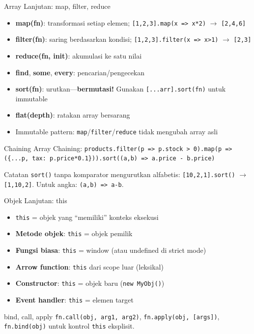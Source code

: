 \documentclass[handout]{beamer}
\begin{document}
\begin{frame}{Array Lanjutan: map, filter, reduce}
	\begin{itemize}
		\item \textbf{map(fn)}: transformasi setiap elemen; \texttt{[1,2,3].map(x => x*2)} $\to$ \texttt{[2,4,6]}
		\item \textbf{filter(fn)}: saring berdasarkan kondisi; \texttt{[1,2,3].filter(x => x>1)} $\to$ \texttt{[2,3]}
		\item \textbf{reduce(fn, init)}: akumulasi ke satu nilai
		\item \textbf{find}, \textbf{some}, \textbf{every}: pencarian/pengecekan
		\item \textbf{sort(fn)}: urutkan---\textbf{bermutasi!} Gunakan \texttt{[...arr].sort(fn)} untuk immutable
		\item \textbf{flat(depth)}: ratakan array bersarang
		\item Immutable pattern: \texttt{map}/\texttt{filter}/\texttt{reduce} tidak mengubah array asli
	\end{itemize}
\end{frame}

\begin{frame}{Chaining Array}
	Chaining: \texttt{products.filter(p => p.stock > 0).map(p => (\{...p, tax: p.price*0.1\})).sort((a,b) => a.price - b.price)}
	\vspace{0.5em}
	\begin{block}{Catatan}
		\texttt{sort()} tanpa komparator mengurutkan alfabetis: \texttt{[10,2,1].sort()} $\to$ \texttt{[1,10,2]}. Untuk angka: \texttt{(a,b) => a-b}.
	\end{block}
\end{frame}

\begin{frame}{Objek Lanjutan: this}
	\begin{itemize}
		\item \texttt{this} = objek yang ``memiliki'' konteks eksekusi
		\item \textbf{Metode objek}: \texttt{this} = objek pemilik
		\item \textbf{Fungsi biasa}: \texttt{this} = window (atau undefined di strict mode)
		\item \textbf{Arrow function}: \texttt{this} dari scope luar (leksikal)
		\item \textbf{Constructor}: \texttt{this} = objek baru (\texttt{new MyObj()})
		\item \textbf{Event handler}: \texttt{this} = elemen target
	\end{itemize}
	\begin{block}{bind, call, apply}
		\texttt{fn.call(obj, arg1, arg2)}, \texttt{fn.apply(obj, [args])}, \texttt{fn.bind(obj)} untuk kontrol \texttt{this} eksplisit.
	\end{block}
\end{frame}
\end{document}
